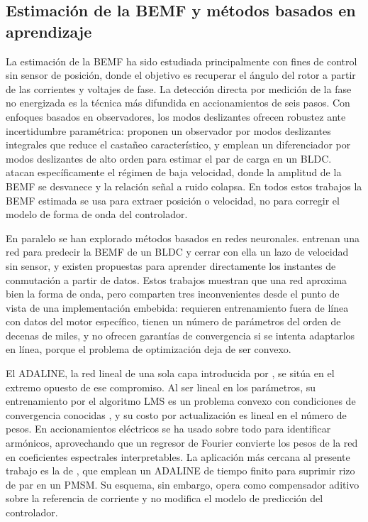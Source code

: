 \documentclass[../../../Tesis_JALS_Maestria.tex]{subfiles}
\begin{document}
\subsection{Estimación de la BEMF y métodos basados en aprendizaje}

La estimación de la BEMF ha sido estudiada principalmente con fines de control sin sensor de posición, donde el objetivo es recuperar el ángulo del rotor a partir de las corrientes y voltajes de fase. La detección directa por medición de la fase no energizada \citep{shao2003direct} es la técnica más difundida en accionamientos de seis pasos. Con enfoques basados en observadores, los modos deslizantes ofrecen robustez ante incertidumbre paramétrica: \citet{shao2019ismo} proponen un observador por modos deslizantes integrales que reduce el castañeo característico, y \citet{coronado2023} emplean un diferenciador por modos deslizantes de alto orden para estimar el par de carga en un BLDC. \citet{li2019highstability} atacan específicamente el régimen de baja velocidad, donde la amplitud de la BEMF se desvanece y la relación señal a ruido colapsa. En todos estos trabajos la BEMF estimada se usa para extraer posición o velocidad, no para corregir el modelo de forma de onda del controlador.

En paralelo se han explorado métodos basados en redes neuronales. \citet{ali2024ann} entrenan una red para predecir la BEMF de un BLDC y cerrar con ella un lazo de velocidad sin sensor, y existen propuestas para aprender directamente los instantes de conmutación a partir de datos. Estos trabajos muestran que una red aproxima bien la forma de onda, pero comparten tres inconvenientes desde el punto de vista de una implementación embebida: requieren entrenamiento fuera de línea con datos del motor específico, tienen un número de parámetros del orden de decenas de miles, y no ofrecen garantías de convergencia si se intenta adaptarlos en línea, porque el problema de optimización deja de ser convexo.

El ADALINE, la red lineal de una sola capa introducida por \citet{widrow1960adaline}, se sitúa en el extremo opuesto de ese compromiso. Al ser lineal en los parámetros, su entrenamiento por el algoritmo LMS es un problema convexo con condiciones de convergencia conocidas \citep{widrow1985adaptive, haykin2014adaptive}, y su costo por actualización es lineal en el número de pesos. En accionamientos eléctricos se ha usado sobre todo para identificar armónicos, aprovechando que un regresor de Fourier convierte los pesos de la red en coeficientes espectrales interpretables. La aplicación más cercana al presente trabajo es la de \citet{zhao2025adaline}, que emplean un ADALINE de tiempo finito para suprimir rizo de par en un PMSM. Su esquema, sin embargo, opera como compensador aditivo sobre la referencia de corriente y no modifica el modelo de predicción del controlador.
\end{document}
